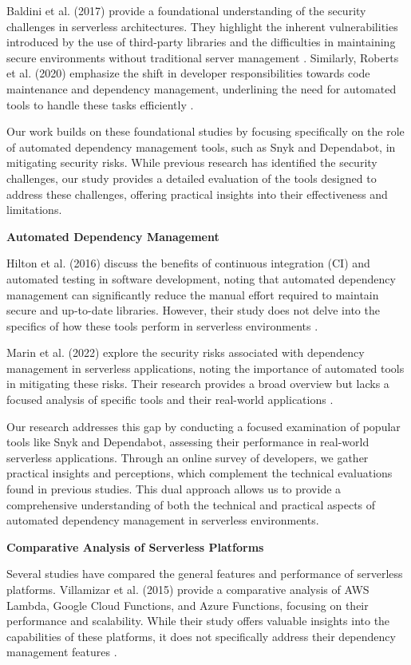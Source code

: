 \documentclass[sigconf]{acmart}
\begin{document}
Baldini et al. (2017) provide a foundational understanding of the security challenges in serverless architectures. They highlight the inherent vulnerabilities introduced by the use of third-party libraries and the difficulties in maintaining secure environments without traditional server management \cite{baldini2017serverless}. Similarly, Roberts et al. (2020) emphasize the shift in developer responsibilities towards code maintenance and dependency management, underlining the need for automated tools to handle these tasks efficiently \cite{roberts2020lambda}.

Our work builds on these foundational studies by focusing specifically on the role of automated dependency management tools, such as Snyk and Dependabot, in mitigating security risks. While previous research has identified the security challenges, our study provides a detailed evaluation of the tools designed to address these challenges, offering practical insights into their effectiveness and limitations.

\textbf{Automated Dependency Management}

Hilton et al. (2016) discuss the benefits of continuous integration (CI) and automated testing in software development, noting that automated dependency management can significantly reduce the manual effort required to maintain secure and up-to-date libraries. However, their study does not delve into the specifics of how these tools perform in serverless environments \cite{hilton2016ci}.

Marin et al. (2022) explore the security risks associated with dependency management in serverless applications, noting the importance of automated tools in mitigating these risks. Their research provides a broad overview but lacks a focused analysis of specific tools and their real-world applications \cite{marin2022serverless}.

Our research addresses this gap by conducting a focused examination of popular tools like Snyk and Dependabot, assessing their performance in real-world serverless applications. Through an online survey of developers, we gather practical insights and perceptions, which complement the technical evaluations found in previous studies. This dual approach allows us to provide a comprehensive understanding of both the technical and practical aspects of automated dependency management in serverless environments.

\textbf{Comparative Analysis of Serverless Platforms}

Several studies have compared the general features and performance of serverless platforms. Villamizar et al. (2015) provide a comparative analysis of AWS Lambda, Google Cloud Functions, and Azure Functions, focusing on their performance and scalability. While their study offers valuable insights into the capabilities of these platforms, it does not specifically address their dependency management features \cite{villamizar2015evaluating}.
\end{document}
